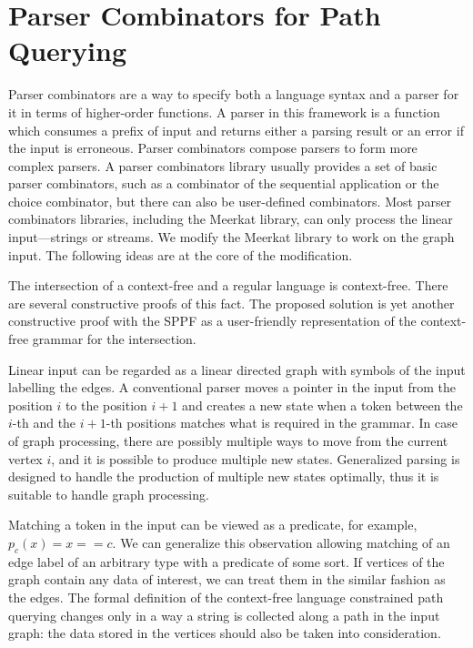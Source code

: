 \section{Parser Combinators for Path Querying}
\label{sec:combinators}

Parser combinators are a way to specify both a language syntax and a parser for it in terms of higher-order functions.
A parser in this framework is a function which consumes a prefix of input and returns either a parsing result or an error if the input is erroneous.
Parser combinators compose parsers to form more complex parsers.
A parser combinators library usually provides a set of basic parser combinators, such as a combinator of the sequential application or the choice combinator, but there can also be user-defined combinators.
Most parser combinators libraries, including the Meerkat library, can only process the linear input---strings or streams.
We modify the Meerkat library to work on the graph input. The following ideas are at the core of the modification.

The intersection of a context-free and a regular language is context-free. There are several constructive proofs of this fact.
The proposed solution is yet another constructive proof with the SPPF as a user-friendly representation of the context-free grammar for the intersection.

Linear input can be regarded as a linear directed graph with symbols of the input labelling the edges.
A conventional parser moves a pointer in the input from the position $i$ to the position $i+1$ and creates a new state when a token between the $i$-th and the $i+1$-th positions matches what is required in the grammar.
In case of graph processing, there are possibly multiple ways to move from the current vertex $i$, and it is possible to produce multiple new states.
Generalized parsing is designed to handle the production of multiple new states optimally, thus it is suitable to handle graph processing.

Matching a token in the input can be viewed as a predicate, for example, $p_c (x) = x == c$.
We can generalize this observation allowing matching of an edge label of an arbitrary type with a predicate of some sort.
If vertices of the graph contain any data of interest, we can treat them in the similar fashion as the edges.
The formal definition of the context-free language constrained path querying changes only in a way a string is collected along a path in the input graph: the data stored in the vertices should also be taken into consideration.

